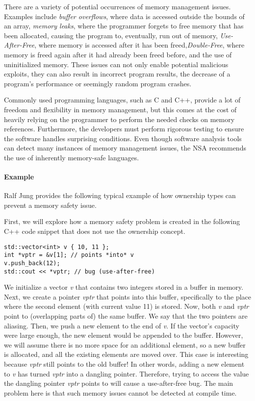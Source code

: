 \documentclass[sigplan,11pt,nonacm]{acmart}
\begin{document}
There are a variety of potential occurrences of memory management issues.
Examples include \emph{buffer overflows}, where data is accessed outside the bounds of an array, \emph{memory leaks}, where the programmer forgets to free memory that has been allocated, causing the program to, eventually, run out of memory, \emph{Use-After-Free}, where memory is accessed after it has been freed,\emph{Double-Free}, where memory is freed again after it had already been freed before, and the use of uninitialized memory.
These issues can not only enable potential malicious exploits, they can also result in incorrect program results, the decrease of a program's performance or seemingly random program crashes.

Commonly used programming languages, such as C and C++, provide a lot of freedom and flexibility in memory management, but this comes at the cost of heavily relying on the programmer to perform the needed checks on memory references.
Furthermore, the developers must perform rigorous testing to ensure the software handles surprising conditions.
Even though software analysis tools can detect many instances of memory management issues, the NSA recommends the use of inherently memory-safe languages.

\paragraph{Example}

Ralf Jung \cite{understanding-evolving-rust} provides the following typical example of how ownership types can prevent a memory safety issue.

First, we will explore how a memory safety problem is created in the following C++ code snippet that does not use the ownership concept.

\begin{lstlisting}
std::vector<int> v { 10, 11 };
int *vptr = &v[1]; // points *into* v
v.push_back(12);
std::cout << *vptr; // bug (use-after-free)
\end{lstlisting}

We initialize a vector \emph{v} that contains two integers stored in a buffer in memory.
Next, we create a pointer \emph{vptr} that points into this buffer, specifically to the place where the second element (with current value 11) is stored.
Now, both \emph{v} and \emph{vptr} point to (overlapping parts of) the same buffer.
We say that the two pointers are aliasing.
Then, we push a new element to the end of \emph{v}.
If the vector's capacity were large enough, the new element would be appended to the buffer.
However, we will assume there is no more space for an additional element, so a new buffer is allocated, and all the existing elements are moved over.
This case is interesting because \emph{vptr} still points to the old buffer!
In other words, adding a new element to \emph{v} has turned \emph{vptr} into a dangling pointer.
Therefore, trying to access the value the dangling pointer \emph{vptr} points to will cause a use-after-free bug.
The main problem here is that such memory issues cannot be detected at compile time.
\end{document}
